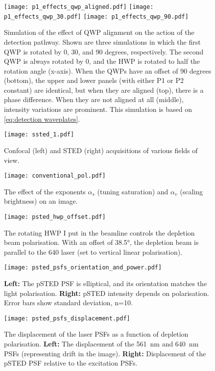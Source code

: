 \begin{figure}
	\centering
	\texttt{[image: p1\_effects\_qwp\_aligned.pdf]}
	\texttt{[image: p1\_effects\_qwp\_30.pdf]}
	\texttt{[image: p1\_effects\_qwp\_90.pdf]}
	\caption{
		Simulation of the effect of QWP alignment on the action of the detection pathway. Shown are three simulations in which the first QWP is rotated by 0, 30, and 90 degrees, respectively. The second QWP is always rotated by 0, and the HWP is rotated to half the rotation angle (x-axis). When the QWPs have an offset of 90 degrees (bottom), the upper and lower panels (with either P1 or P2 constant) are identical, but when they are aligned (top), there is a phase difference. When they are not aligned at all (middle), intensity variations are prominent. This simulation is based on \autoref{eq:detection waveplates}.
	}
	\label{fig:detection waveplate simulations}
\end{figure}

\begin{figure}
	\centering
	\texttt{[image: ssted\_1.pdf]}
	\caption{
		Confocal (left) and STED (right) acquisitions of various fields of view.
	}
	\label{fig:ssted supplementary}
\end{figure}


\begin{figure}
	\centering
	\texttt{[image: conventional\_pol.pdf]}
	\caption{
		The effect of the exponents $ \alpha_s $ (tuning saturation) and $ \alpha_v $ (scaling brightness) on an image.
	}
	\label{fig:power law exponents}
\end{figure}

\begin{figure}
	\centering
	\texttt{[image: psted\_hwp\_offset.pdf]}
	\caption{
		The rotating HWP I put in the beamline controls the depletion beam polarisation. With an offset of 38.5°, the depletion beam is parallel to the 640 laser (set to vertical linear polarisation).
	}
	\label{fig:psted hwp offset}
\end{figure}

\begin{figure}
	\centering
	\texttt{[image: psted\_psfs\_orientation\_and\_power.pdf]}
	\caption{
		\textbf{Left:} The pSTED PSF is elliptical, and its orientation matches the light polarisation. \textbf{Right:} pSTED intensity depends on polarisation. Error bars show standard deviation, n=10.
	}
	\label{fig:psted psf orientation and power}
\end{figure}

\begin{figure}
	\centering
	\texttt{[image: psted\_psfs\_displacement.pdf]}
	\caption{
		The displacement of the laser PSFs as a function of depletion polarisation. \textbf{Left:} The displacement of the 561~nm and 640~nm PSFs (representing drift in the image). \textbf{Right:} Displacement of the pSTED PSF relative to the excitation PSFs.
	}
	\label{fig:psted displacement}
\end{figure}